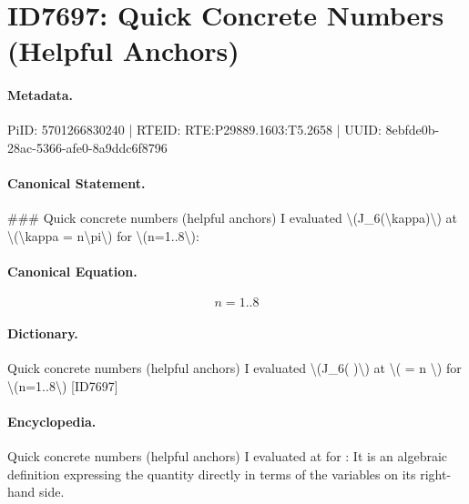 \section*{ID7697: Quick Concrete Numbers (Helpful Anchors)}
\paragraph{Metadata.}
PiID: 5701266830240 | RTEID: RTE:P29889.1603:T5.2658 | UUID: 8ebfde0b-28ac-5366-afe0-8a9ddc6f8796

\paragraph{Canonical Statement.}
\#\#\# Quick concrete numbers (helpful anchors) I evaluated \textbackslash{}(J\_6(\textbackslash{}kappa)\textbackslash{}) at \textbackslash{}(\textbackslash{}kappa = n\textbackslash{}pi\textbackslash{}) for \textbackslash{}(n=1..8\textbackslash{}):

\paragraph{Canonical Equation.}
\[
n=1..8
\]

\paragraph{Dictionary.}
Quick concrete numbers (helpful anchors) I evaluated \textbackslash{}(J\_6( )\textbackslash{}) at \textbackslash{}( = n \textbackslash{}) for \textbackslash{}(n=1..8\textbackslash{}) [ID7697]

\paragraph{Encyclopedia.}
Quick concrete numbers (helpful anchors) I evaluated at for : It is an algebraic definition expressing the quantity directly in terms of the variables on its right-hand side.
